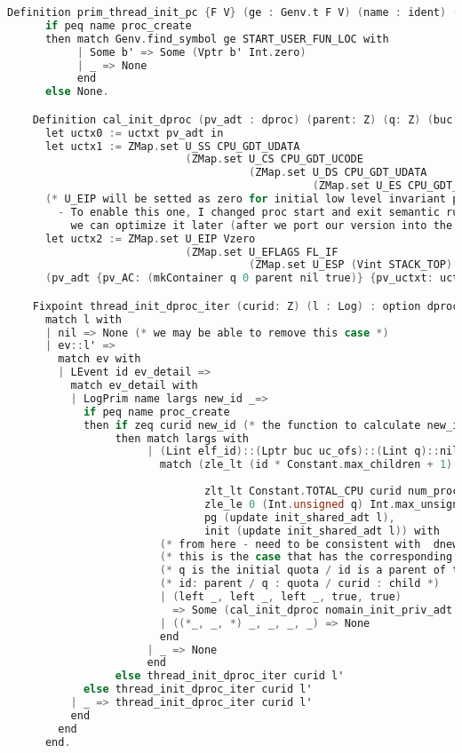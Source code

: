 \begin{lstlisting}[language=C]
    Definition prim_thread_init_pc {F V} (ge : Genv.t F V) (name : ident) (args : list lval): option val :=
      if peq name proc_create
      then match Genv.find_symbol ge START_USER_FUN_LOC with
           | Some b' => Some (Vptr b' Int.zero)
           | _ => None
           end
      else None.

    Definition cal_init_dproc (pv_adt : dproc) (parent: Z) (q: Z) (buc : block) (uc_ofs : int): dproc:= 
      let uctx0 := uctxt pv_adt in
      let uctx1 := ZMap.set U_SS CPU_GDT_UDATA
                            (ZMap.set U_CS CPU_GDT_UCODE 
                                      (ZMap.set U_DS CPU_GDT_UDATA
                                                (ZMap.set U_ES CPU_GDT_UDATA uctx0))) in
      (* U_EIP will be setted as zero for initial low level invariant proofs  
        - To enable this one, I changed proc start and exit semantic rules 
          we can optimize it later (after we port our version into the new layer framework *)
      let uctx2 := ZMap.set U_EIP Vzero
                            (ZMap.set U_EFLAGS FL_IF 
                                      (ZMap.set U_ESP (Vint STACK_TOP) uctx1)) in
      (pv_adt {pv_AC: (mkContainer q 0 parent nil true)} {pv_uctxt: uctx2}).

    Fixpoint thread_init_dproc_iter (curid: Z) (l : Log) : option dproc :=
      match l with 
      | nil => None (* we may be able to remove this case *)
      | ev::l' => 
        match ev with 
        | LEvent id ev_detail =>
          match ev_detail with 
          | LogPrim name largs new_id _=>
            if peq name proc_create 
            then if zeq curid new_id (* the function to calculate new_id is defined in ObjPHBThreadreplayfunction.v file *) 
                 then match largs with 
                      | (Lint elf_id)::(Lptr buc uc_ofs)::(Lint q)::nil =>
                        match (zle_lt (id * Constant.max_children + 1) curid (id * Constant.max_children 
                                                                              + 1 + Constant.max_children),
                               zlt_lt Constant.TOTAL_CPU curid num_proc,
                               zle_le 0 (Int.unsigned q) Int.max_unsigned,
                               pg (update init_shared_adt l), 
                               init (update init_shared_adt l)) with    
                        (* from here - need to be consistent with  dnew_semantics in layerlib/PrimSemantics.v *) 
                        (* this is the case that has the corresponding spawn and return the initialized private adt *)
                        (* q is the initial quota / id is a parent of this thread *)
                        (* id: parent / q : quota / curid : child *)
                        | (left _, left _, left _, true, true) 
                          => Some (cal_init_dproc nomain_init_priv_adt id (Int.unsigned q) buc uc_ofs)
                        | ((*_, _, *) _, _, _, _) => None
                        end
                      | _ => None 
                      end
                 else thread_init_dproc_iter curid l'
            else thread_init_dproc_iter curid l'
          | _ => thread_init_dproc_iter curid l'
          end
        end
      end.
    

\end{lstlisting}
